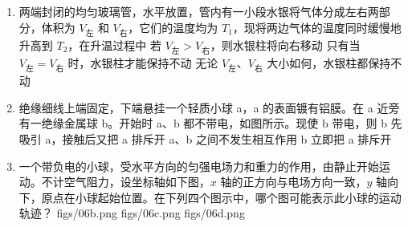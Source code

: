 \documentclass[\gkver]{gaokaozhenti}
\begin{document}
\begin{enumerate}
\item
两端封闭的均匀玻璃管，水平放置，管内有一小段水银将气体分成左右两部分，体积为 $V_{\text{左}}$ 和 $V_{\text{右}}$，它们的温度均为 $T_{1}$，现将两边气体的温度同时缓慢地升高到 $T_{2}$，在升温过程中
{若 $V_{\text{左}} > V_{\text{右}}$，则水银柱将向右移动}
{只有当 $V_{\text{左}} = V_{\text{右}}$ 时，水银柱才能保持不动}
{无论 $V_{\text{左}}$、$V_{\text{右}}$ 大小如何，水银柱都保持不动}


\item
绝缘细线上端固定，下端悬挂一个轻质小球 a，a 的表面镀有铝膜。在 a 近旁有一绝缘金属球 b。开始时 a、b 都不带电，如图所示。现使 b 带电，则
{b 先吸引 a，接触后又把 a 排斥开}
{a、b 之间不发生相互作用}
{b 立即把 a 排斥开}


\item
一个带负电的小球，受水平方向的匀强电场力和重力的作用，由静止开始运动。不计空气阻力，设坐标轴如下图，$x$ 轴的正方向与电场方向一致，$y$ 轴向下，原点在小球起始位置。在下列四个图示中，哪个图可能表示此小球的运动轨迹？
{figs/06b.png}
{figs/06c.png}
{figs/06d.png}



\end{enumerate}
\end{document}
